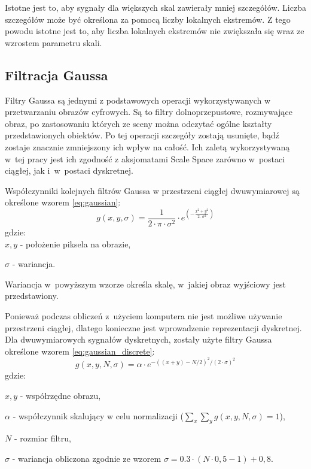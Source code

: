 Istotne jest to, aby sygnały dla większych skal zawierały mniej szczegółów. Liczba szczegółów może być określona za pomocą liczby lokalnych ekstremów. Z tego powodu istotne jest to, aby liczba lokalnych ekstremów nie zwiększała się wraz ze wzrostem parametru skali.

\subsection{Filtracja Gaussa}
\label{subsec:filtracjaGaussa}
Filtry Gaussa są jednymi z podstawowych operacji wykorzystywanych w przetwarzaniu obrazów cyfrowych. Są to filtry dolnoprzepustowe, rozmywające obraz, po zastosowaniu których ze sceny można odczytać ogólne kształty przedstawionych obiektów. Po tej operacji szczegóły zostają usunięte, bądź zostaje znacznie zmniejszony ich wpływ na całość. Ich zaletą wykorzystywaną w~tej pracy jest ich zgodność z aksjomatami Scale Space zarówno w~postaci ciągłej, jak i~w~postaci dyskretnej.

Współczynniki kolejnych filtrów Gaussa w przestrzeni ciągłej dwuwymiarowej są określone wzorem \ref{eq:gaussian}:
\begin{equation}
\label{eq:gaussian}
g(x,y,\sigma)=\frac{1}{2 \cdot \pi \cdot \sigma^ {2} }\cdot e^{(-\frac{x^{2} + y^{2}}{2 \cdot \sigma ^{2}})}
\end{equation}
gdzie:\\

$ x,y $ - położenie piksela na obrazie,

$ \sigma $ - wariancja.

Wariancja w~powyższym wzorze określa skalę, w~jakiej obraz wyjściowy jest przedstawiony. 

Ponieważ podczas obliczeń z~użyciem komputera nie jest możliwe używanie przestrzeni ciągłej, dlatego konieczne jest wprowadzenie reprezentacji dyskretnej. 
Dla dwuwymiarowych sygnałów dyskretnych, zostały użyte filtry Gaussa określone wzorem \ref{eq:gaussian_discrete}:
\begin{equation}
\label{eq:gaussian_discrete}
g(x,y,N,\sigma) = \alpha \cdot e^{-((x+y)-N/2)^2/(2 \cdot \sigma)^2}
\end{equation}
gdzie:

$ x, y$ - współrzędne obrazu,

$ \alpha $ - współczynnik skalujący w celu normalizacji ($ \sum_x \sum_y g(x,y,N,\sigma) = 1 $),

$ N $ - rozmiar filtru,

$ \sigma $ - wariancja obliczona zgodnie ze wzorem $ \sigma = 0.3 \cdot (N \cdot 0,5 - 1) + 0,8$.

